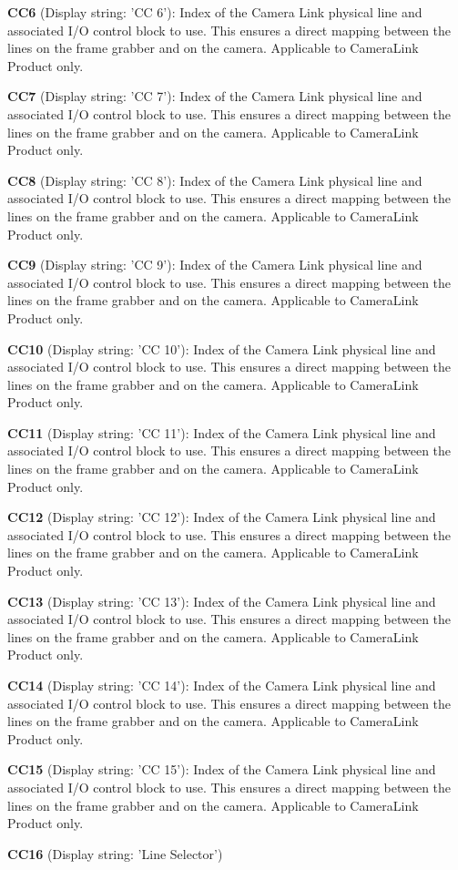 \begin{DoxyItemize}
\item {\bfseries C\+C6} (Display string\+: 'C\+C 6')\+: Index of the Camera Link physical line and associated I/\+O control block to use. This ensures a direct mapping between the lines on the frame grabber and on the camera. Applicable to Camera\+Link Product only.
\item {\bfseries C\+C7} (Display string\+: 'C\+C 7')\+: Index of the Camera Link physical line and associated I/\+O control block to use. This ensures a direct mapping between the lines on the frame grabber and on the camera. Applicable to Camera\+Link Product only.
\item {\bfseries C\+C8} (Display string\+: 'C\+C 8')\+: Index of the Camera Link physical line and associated I/\+O control block to use. This ensures a direct mapping between the lines on the frame grabber and on the camera. Applicable to Camera\+Link Product only.
\item {\bfseries C\+C9} (Display string\+: 'C\+C 9')\+: Index of the Camera Link physical line and associated I/\+O control block to use. This ensures a direct mapping between the lines on the frame grabber and on the camera. Applicable to Camera\+Link Product only.
\item {\bfseries C\+C10} (Display string\+: 'C\+C 10')\+: Index of the Camera Link physical line and associated I/\+O control block to use. This ensures a direct mapping between the lines on the frame grabber and on the camera. Applicable to Camera\+Link Product only.
\item {\bfseries C\+C11} (Display string\+: 'C\+C 11')\+: Index of the Camera Link physical line and associated I/\+O control block to use. This ensures a direct mapping between the lines on the frame grabber and on the camera. Applicable to Camera\+Link Product only.
\item {\bfseries C\+C12} (Display string\+: 'C\+C 12')\+: Index of the Camera Link physical line and associated I/\+O control block to use. This ensures a direct mapping between the lines on the frame grabber and on the camera. Applicable to Camera\+Link Product only.
\item {\bfseries C\+C13} (Display string\+: 'C\+C 13')\+: Index of the Camera Link physical line and associated I/\+O control block to use. This ensures a direct mapping between the lines on the frame grabber and on the camera. Applicable to Camera\+Link Product only.
\item {\bfseries C\+C14} (Display string\+: 'C\+C 14')\+: Index of the Camera Link physical line and associated I/\+O control block to use. This ensures a direct mapping between the lines on the frame grabber and on the camera. Applicable to Camera\+Link Product only.
\item {\bfseries C\+C15} (Display string\+: 'C\+C 15')\+: Index of the Camera Link physical line and associated I/\+O control block to use. This ensures a direct mapping between the lines on the frame grabber and on the camera. Applicable to Camera\+Link Product only.
\item {\bfseries C\+C16} (Display string\+: 'Line Selector')
\end{DoxyItemize}

